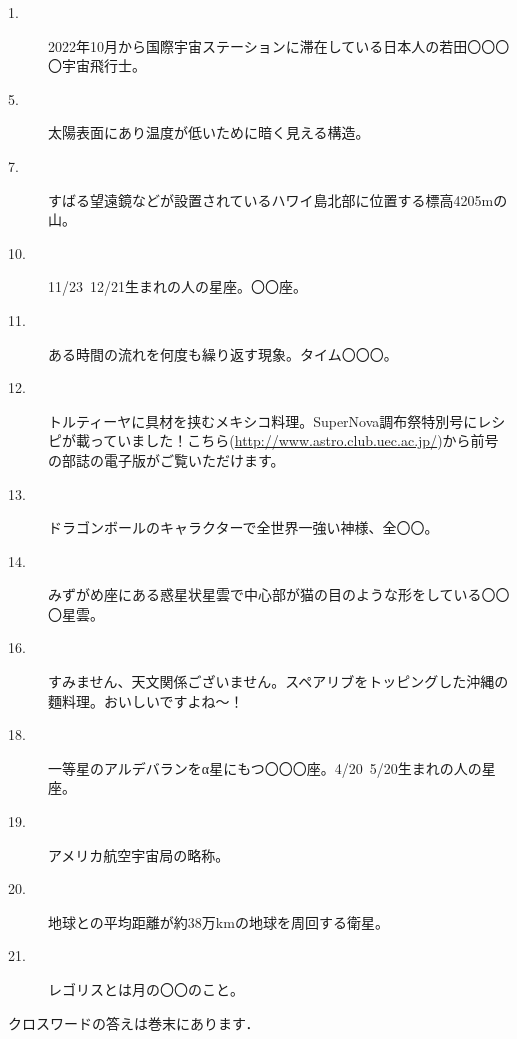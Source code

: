 \documentclass[../../super_nova_2023]{subfiles}
\begin{document}
\begin{tcolorbox}[title=よこのカギ]
	\begin{description}
		\item[1. ] 2022年10月から国際宇宙ステーションに滞在している日本人の若田〇〇〇〇宇宙飛行士。
		\item[5. ] 太陽表面にあり温度が低いために暗く見える構造。
		\item[7. ] すばる望遠鏡などが設置されているハワイ島北部に位置する標高4205mの山。
		\item[10. ] 11/23~12/21生まれの人の星座。〇〇座。
		\item[11. ] ある時間の流れを何度も繰り返す現象。タイム〇〇〇。
		\item[12. ] トルティーヤに具材を挟むメキシコ料理。SuperNova調布祭特別号にレシピが載っていました！こちら(\url{http://www.astro.club.uec.ac.jp/})から前号の部誌の電子版がご覧いただけます。
		\item[13. ] ドラゴンボールのキャラクターで全世界一強い神様、全〇〇。
		\item[14. ] みずがめ座にある惑星状星雲で中心部が猫の目のような形をしている〇〇〇星雲。
		\item[16. ] すみません、天文関係ございません。スペアリブをトッピングした沖縄の麵料理。おいしいですよね～！
		\item[18. ] 一等星のアルデバランをα星にもつ〇〇〇座。4/20~5/20生まれの人の星座。
		\item[19. ] アメリカ航空宇宙局の略称。
		\item[20. ] 地球との平均距離が約38万kmの地球を周回する衛星。
		\item[21. ] レゴリスとは月の〇〇のこと。
	\end{description}
\end{tcolorbox}
\vspace{3\zw}
{\footnotesize クロスワードの答えは巻末にあります．}
\end{document}
